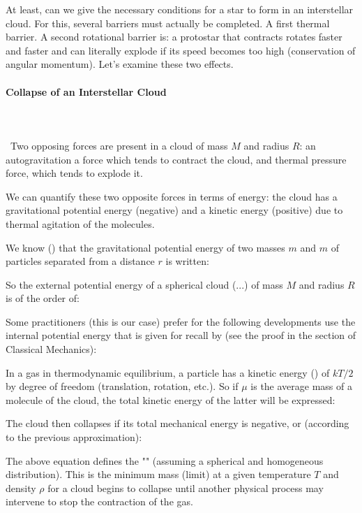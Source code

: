	At least, can we give the necessary conditions for a star to form in an interstellar cloud. For this, several barriers must actually be completed. A first thermal barrier. A second rotational barrier is: a protostar that contracts rotates faster and faster and can literally explode if its speed becomes too high (conservation of angular momentum). Let's examine these two effects.
	
	
	\paragraph{Collapse of an Interstellar Cloud}\mbox{}\\\\\
	Two opposing forces are present in a cloud of mass $M$ and radius $R$: an autogravitation a force which tends to contract the cloud, and thermal pressure force, which tends to explode it.
	
	We can quantify these two opposite forces in terms of energy: the cloud has a gravitational potential energy (negative) and a kinetic energy (positive) due to thermal agitation of the molecules.

	We know () that the gravitational potential energy of two masses $m$ and $m$ of particles separated from a distance $r$ is written:
	
	So the external potential energy of a spherical cloud (...) of mass $M$ and radius $R$ is of the order of:
	
	\begin{tcolorbox}[title=Remark,colframe=black,arc=10pt]
	Some practitioners (this is our case) prefer for the following developments use the internal potential energy that is given for recall by (see the proof in the section of Classical Mechanics):
	
	\end{tcolorbox}
	In a gas in thermodynamic equilibrium, a particle has a kinetic energy () of $kT/2$ by degree of freedom (translation, rotation, etc.). So if $\mu$ is the average mass of a molecule of the cloud, the total kinetic energy of the latter will be expressed:
	
	The cloud then collapses if its total mechanical energy is negative, or (according to the previous approximation):
	
	The above equation defines the "" (assuming a spherical and homogeneous distribution). This is the minimum mass (limit) at a given temperature $T$ and density $\rho$ for a cloud begins to collapse until another physical process may intervene to stop the contraction of the gas.
	
